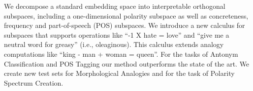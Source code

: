We decompose a standard embedding space into interpretable orthogonal subspaces, including a one-dimensional polarity subspace as well as concreteness, frequency and part-of-speech (POS) subspaces. We introduce a new calculus for subspaces that supports operations like ``-1 X hate = love'' and ``give me a neutral word for greasy'' (i.e., oleaginous). This calculus extends analogy computations like ``king - man + woman = queen''. For the tasks of Antonym Classification and POS Tagging our method outperforms the state of the art. We create new test sets for Morphological Analogies and for the task of Polarity Spectrum Creation.
